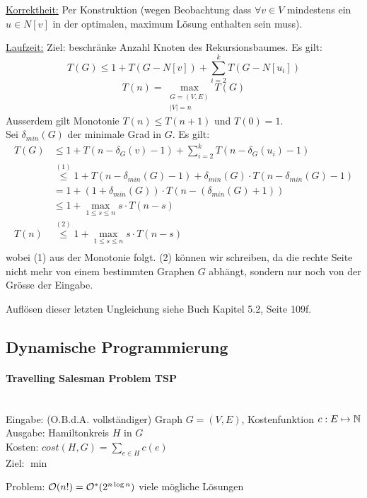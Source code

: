 \underline{Korrektheit:} Per Konstruktion (wegen Beobachtung dass $\forall v \in V$ mindestens ein $u \in N[v]$ in der optimalen, maximum Lösung enthalten sein muss).

\underline{Laufzeit:}
Ziel: beschränke Anzahl Knoten des Rekursionsbaumes. Es gilt:
$$ T(G) \leq 1 + T(G-N[v]) + \sum_{i=2}^k T(G-N[u_i]) $$
$$ T(n) = \max_{\substack{ G=(V,E) \\ |V|=n}} T(G) $$
%
Ausserdem gilt Monotonie $T(n) \leq T(n+1)$ und $T(0) = 1$. \\
Sei $\delta_{min}(G)$ der minimale Grad in $G$. Es gilt:
%
\begin{align*}
T(G) & \leq 1 + T(n - \delta_G(v) - 1) + \sum_{i=2}^k T(n - \delta_G(u_i) - 1) \\
     & \overset{(1)}{\leq} 1 + T(n - \delta_{min}(G) - 1) + \delta_{min}(G) \cdot T(n - \delta_{min}(G) - 1) \\
     & = 1 + (1 + \delta_{min}(G)) \cdot T(n - (\delta_{min}(G) + 1)) \\
     & \leq 1 + \max_{1 \leq s \leq n} s \cdot T(n - s) \\
T(n) & \overset{(2)}{\leq} 1 + \max_{1 \leq s \leq n} s \cdot T(n - s) \\
\end{align*}
wobei (1) aus der Monotonie folgt.
(2) können wir schreiben, da die rechte Seite nicht mehr von einem bestimmten Graphen $G$ abhängt,
sondern nur noch von der Grösse der Eingabe.

Auflösen dieser letzten Ungleichung siehe Buch Kapitel 5.2, Seite 109f.


\subsection{Dynamische Programmierung}

\paragraph{Travelling Salesman Problem TSP} \mbox{} \\
Eingabe: (O.B.d.A. vollständiger) Graph $G=(V,E)$, Kostenfunktion $c : E \mapsto \mathbb{N}$ \\
Ausgabe: Hamiltonkreis $H$ in $G$ \\
Kosten: $cost(H, G) = \sum_{e \in H} c(e) $ \\
Ziel: $\min$

Problem: $\mathcal{O}(n!) = \mathcal{O}^* (2^{n \log n})$ viele mögliche Lösungen

